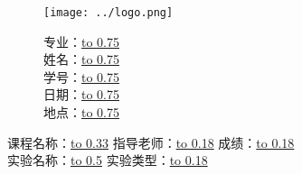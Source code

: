 \documentclass[UTF8]{article}%
\begin{document}
	\thispagestyle{plain}
	\vspace{-4ex}
	\begin{figure}[h]
		\centering
		\qquad\qquad\qquad
		\texttt{[image: ../logo.png]}
		\qquad\qquad\qquad
		\parbox[b]{4cm}{
			专业：\underline{\hbox to 0.75\linewidth{\hfill \Major \hfill}}\\

			\vspace{-1.5ex}
			姓名：\underline{\hbox to 0.75\linewidth{\hfill \StudentName \hfill}}\\

			\vspace{-1.5ex}
			学号：\underline{\hbox to 0.75\linewidth{\hfill \StudentID \hfill}}\\

			\vspace{-1.5ex}
			日期：\underline{\hbox to 0.75\linewidth{\hfill \Date \hfill}}\\

			\vspace{-1.5ex}
			地点：\underline{\hbox to 0.75\linewidth{\hfill \Address \hfill}}\\
		}
	\end{figure}
\hspace{-2em}
\parbox{\linewidth}{
	课程名称：\underline{\hbox to 0.33\linewidth{\hfill \CourseName \hfill}}
	指导老师：\underline{\hbox to 0.18\linewidth{\hfill \Teacher \hfill}}
	成绩：\underline{\hbox to 0.18\linewidth{\hfill \hfill}}\\
	实验名称：\underline{\hbox to 0.5\linewidth{\hfill \ProjectName \hfill}}
	实验类型：\underline{\hbox to 0.18\linewidth{\hfill \ProjectType \hfill}}
}
\end{document}
